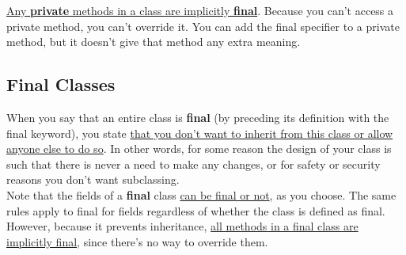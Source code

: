 \documentclass[10pt,letterpaper]{report}
\begin{document}
\underline{Any \textbf{private} methods in a class are implicitly \textbf{final}}. Because you can't access a private method, you can't override it. You can add the final specifier to a private method, but it doesn't give that method any extra meaning.
\subsection{Final Classes}
When you say that an entire class is \textbf{final} (by preceding its definition with the final keyword), you state \underline{that you don't want to inherit from this class or allow} \underline{anyone else to do so}. In other words, for some reason the design of your class is such that there is never a need to make any changes, or for safety or security reasons you don't want subclassing.\\

Note that the fields of a \textbf{final} class \underline{can be final or not}, as you choose. The same rules apply to final for fields regardless of whether the class is defined as final. However, because it prevents inheritance, \underline{all methods in a final class are} \underline{implicitly final}, since there's no way to override them.
\end{document}
